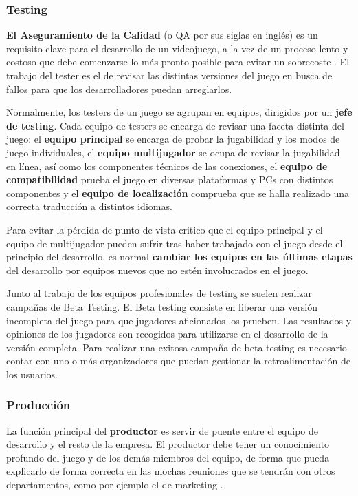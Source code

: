 \subsubsection{Testing}
\textbf{El Aseguramiento de la Calidad} (o QA por sus siglas en inglés) es un requisito clave para el desarrollo de un videojuego, a la vez de un proceso lento y costoso que debe comenzarse lo más pronto posible para evitar un sobrecoste \cite{development_and_production}. El trabajo del tester es el de revisar las distintas versiones del juego en busca de fallos para que los desarrolladores puedan arreglarlos.

Normalmente, los testers de un juego se agrupan en equipos, dirigidos por un \textbf{jefe de testing}. Cada equipo de testers se encarga de revisar una faceta distinta del juego: el \textbf{equipo principal} se encarga de probar la jugabilidad y los modos de juego individuales, el \textbf{equipo multijugador} se ocupa de revisar la jugabilidad en línea, así como los componentes técnicos de las conexiones, el \textbf{equipo de compatibilidad} prueba el juego en diversas plataformas y PCs con distintos componentes y el \textbf{equipo de localización} comprueba que se halla realizado una correcta traducción a distintos idiomas.

Para evitar la pérdida de punto de vista critico que el equipo principal y el equipo de multijugador pueden sufrir tras haber trabajado con el juego desde el principio del desarrollo, es normal \textbf{cambiar los equipos en las últimas etapas} del desarrollo por equipos nuevos que no estén involucrados en el juego.

Junto al trabajo de los equipos profesionales de testing se suelen realizar campañas de Beta Testing. El Beta testing consiste en liberar una versión incompleta del juego para que jugadores aficionados los prueben. Las resultados y opiniones de los jugadores son recogidos para utilizarse en el desarrollo de la versión completa. Para realizar una exitosa campaña de beta testing es necesario contar con uno o más organizadores que puedan gestionar la retroalimentación de los usuarios.

\subsubsection{Producción}
La función principal del \textbf{productor} es servir de puente entre el equipo de desarrollo y el resto de la empresa. El productor debe tener un conocimiento profundo del juego y de los demás miembros del equipo, de forma que pueda explicarlo de forma correcta en las mochas reuniones que se tendrán con otros departamentos, como por ejemplo el de marketing \cite{game_design_2}.

